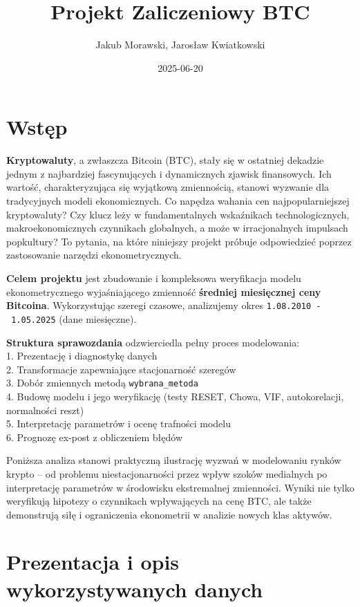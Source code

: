 \documentclass[
  11pt,
]{article}
\title{Projekt Zaliczeniowy BTC}
\author{Jakub Morawski, Jarosław Kwiatkowski}
\date{2025-06-20}
\begin{document}
\maketitle

{
\setcounter{tocdepth}{2}
\tableofcontents
}
\section{Wstęp}\label{wstux119p}

\textbf{Kryptowaluty}, a zwłaszcza Bitcoin (BTC), stały się w ostatniej
dekadzie jednym z najbardziej fascynujących i dynamicznych zjawisk
finansowych. Ich wartość, charakteryzująca się wyjątkową zmiennością,
stanowi wyzwanie dla tradycyjnych modeli ekonomicznych. Co napędza
wahania cen najpopularniejszej kryptowaluty? Czy klucz leży w
fundamentalnych wskaźnikach technologicznych, makroekonomicznych
czynnikach globalnych, a może w irracjonalnych impulsach popkultury? To
pytania, na które niniejszy projekt próbuje odpowiedzieć poprzez
zastosowanie narzędzi ekonometrycznych.

\textbf{Celem projektu} jest zbudowanie i kompleksowa weryfikacja modelu
ekonometrycznego wyjaśniającego zmienność \textbf{średniej miesięcznej
ceny Bitcoina}. Wykorzystując szeregi czasowe, analizujemy okres
\texttt{1.08.2010\ -\ 1.05.2025} (dane miesięczne).

\textbf{Struktura sprawozdania} odzwierciedla pełny proces
modelowania:\\
1. Prezentację i diagnostykę danych\\
2. Transformacje zapewniające stacjonarność szeregów\\
3. Dobór zmiennych metodą \texttt{wybrana\_metoda}\\
4. Budowę modelu i jego weryfikację (testy RESET, Chowa, VIF,
autokorelacji, normalności reszt)\\
5. Interpretację parametrów i ocenę trafności modelu\\
6. Prognozę ex-post z obliczeniem błędów

Poniższa analiza stanowi praktyczną ilustrację wyzwań w modelowaniu
rynków krypto -- od problemu niestacjonarności przez wpływ szoków
medialnych po interpretację parametrów w środowisku ekstremalnej
zmienności. Wyniki nie tylko weryfikują hipotezy o czynnikach
wpływających na cenę BTC, ale także demonstrują siłę i ograniczenia
ekonometrii w analizie nowych klas aktywów.

\section{Prezentacja i opis wykorzystywanych
danych}\label{prezentacja-i-opis-wykorzystywanych-danych}
\end{document}
